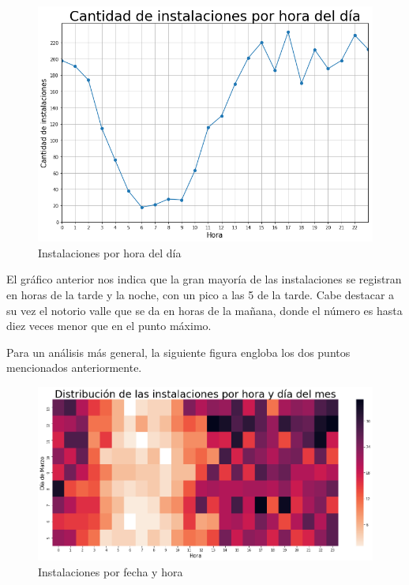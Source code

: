 \documentclass[a4paper, 12pt]{article}
\begin{document}
		\FloatBarrier
		\begin{figure}[h]
			\centering
			\includegraphics[width=\textwidth]{images/installs/installsxhora.png}
			\caption{Instalaciones por hora del día}
		\end{figure}
		\FloatBarrier

		 El gráfico anterior nos indica que la gran mayoría de las instalaciones se registran en horas de la tarde y la noche, con un pico a las 5 de la tarde. Cabe destacar a su vez el notorio valle que se da en horas de la mañana, donde el número es hasta diez veces menor que en el punto máximo.

		 Para un análisis más general, la siguiente figura engloba los dos puntos mencionados anteriormente.

		\FloatBarrier
		\begin{figure}[h]
			\centering
			\includegraphics[width=\textwidth]{images/installs/heatmapfecha.png}
			\caption{Instalaciones por fecha y hora}
		\end{figure}
		\FloatBarrier
\end{document}
